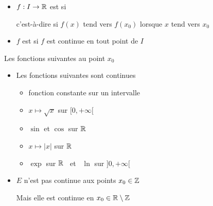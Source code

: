 \begin{frame}

\begin{mydefinition}
\begin{itemize}
  \item $f:I\to\mathbb{R}$ est  si
\vspace*{1ex}

\hspace*{-1.5em}
\begin{minipage}{\textwidth}
\end{minipage}

\vspace*{1ex}
\pause 
c'est-à-dire si $f(x)$ tend vers $f(x_0)$ lorsque $x$ tend vers $x_0$

  \item <4-> $f$ est  si $f$ est continue en tout point de $I$
 \end{itemize}
\end{mydefinition}

 \pause 
\vspace*{-1ex}
 
\end{frame}



\begin{frame}

\centerline{\hspace*{-2em}Les fonctions suivantes  au point $x_0$}

  
\end{frame}


\begin{frame}


\begin{exemple}
\begin{itemize}
\item Les fonctions suivantes sont continues
\begin{itemize}
\item \pause fonction constante sur un intervalle
\item \pause $x\mapsto\sqrt{x}$ sur $[0,+\infty[$
\item \pause $\sin$ et $\cos$ sur $\mathbb{R}$
\item \pause $x\mapsto\vert x\vert$ sur $\mathbb{R}$
\item \pause $\exp$ sur $\mathbb{R}$ \ et \ $\ln$ sur $]0,+\infty[$
\end{itemize}

\item \pause $E$ n'est pas continue aux points $x_0\in\mathbb{Z}$


Mais elle est continue en $x_0\in \mathbb{R} \setminus \mathbb{Z}$
\end{itemize}
\end{exemple}
\end{frame}

